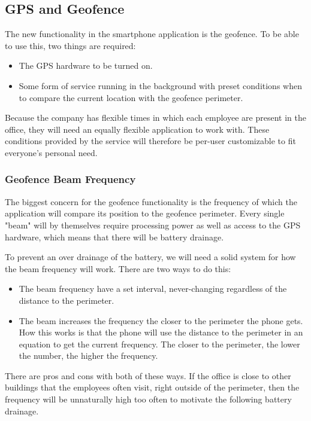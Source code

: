 \clearpage

\subsection{GPS and Geofence}

The new functionality in the smartphone application is the geofence. To be able to use this, two things are required:

\begin{itemize}
\item The GPS hardware to be turned on.
\item Some form of service running in the background with preset conditions when to compare the current location with the geofence perimeter.
\end{itemize}

Because the company has flexible times in which each employee are present in the office, they will need an equally flexible application to work with. These conditions provided by the service will therefore be per-user customizable to fit everyone's personal need.

\subsubsection{Geofence Beam Frequency}

The biggest concern for the geofence functionality is the frequency of which the application will compare its position to the geofence perimeter. Every single "beam" will by themselves require processing power as well as access to the GPS hardware, which means that there will be battery drainage.

To prevent an over drainage of the battery, we will need a solid system for how the beam frequency will work. There are two ways to do this:

\begin{itemize}
\item The beam frequency have a set interval, never-changing regardless of the distance to the perimeter.
\item The beam increases the frequency the closer to the perimeter the phone gets. How this works is that the phone will use the distance to the perimeter in an equation to get the current frequency. The closer to the perimeter, the lower the number, the higher the frequency.
\end{itemize}

There are pros and cons with both of these ways. If the office is close to other buildings that the employees often visit, right outside of the perimeter, then the frequency will be unnaturally high too often to motivate the following battery drainage.

